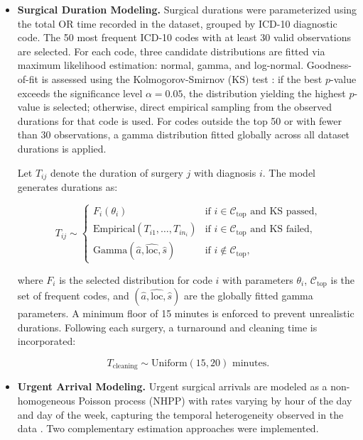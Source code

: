\documentclass[sn-mathphys-num]{sn-jnl}
\begin{document}
\begin{itemize}

  \item \textbf{Surgical Duration Modeling.}
  Surgical durations were parameterized using the total OR time recorded
  in the dataset, grouped by ICD-10 diagnostic code. The 50 most frequent
  ICD-10 codes with at least 30 valid observations are selected. For each
  code, three candidate distributions are fitted via maximum likelihood
  estimation: normal, gamma, and log-normal. Goodness-of-fit is assessed
  using the Kolmogorov-Smirnov (KS) test \cite{strum1997surgical}: if the best
  $p$-value exceeds the significance level $\alpha = 0.05$, the
  distribution yielding the highest $p$-value is selected; otherwise,
  direct empirical sampling from the observed durations for that code is
  used. For codes outside the top 50 or with fewer than 30 observations,
  a gamma distribution fitted globally across all dataset durations is
  applied.

  Let $T_{ij}$ denote the duration of surgery $j$ with diagnosis $i$.
  The model generates durations as:

  \begin{equation}
  T_{ij} \sim \begin{cases}
  F_i(\theta_i) & \text{if } i \in \mathcal{C}_{\text{top}}
  \text{ and KS passed,}\\
  \text{Empirical}(T_{i1}, \ldots, T_{in_i}) & \text{if } i \in
  \mathcal{C}_{\text{top}} \text{ and KS failed,}\\
  \text{Gamma}(\hat{a}, \hat{\text{loc}}, \hat{s}) & \text{if }
  i \notin \mathcal{C}_{\text{top}},
  \end{cases}
  \end{equation}

  where $F_i$ is the selected distribution for code $i$ with parameters
  $\theta_i$, $\mathcal{C}_{\text{top}}$ is the set of frequent codes,
  and $(\hat{a}, \hat{\text{loc}}, \hat{s})$ are the globally fitted
  gamma parameters. A minimum floor of 15 minutes is enforced to prevent
  unrealistic durations. Following each surgery, a turnaround and
  cleaning time is incorporated:

  \begin{equation}
  T_{\text{cleaning}} \sim \text{Uniform}(15, 20) \text{ minutes.}
  \end{equation}

  \item \textbf{Urgent Arrival Modeling.}
  Urgent surgical arrivals are modeled as a non-homogeneous Poisson
  process (NHPP) with rates varying by hour of the day and day of the
  week, capturing the temporal heterogeneity observed in the data \cite{bell2019modeling,alexopoulos2008modeling}. Two complementary estimation approaches were
  implemented.


\end{itemize}
\end{document}
